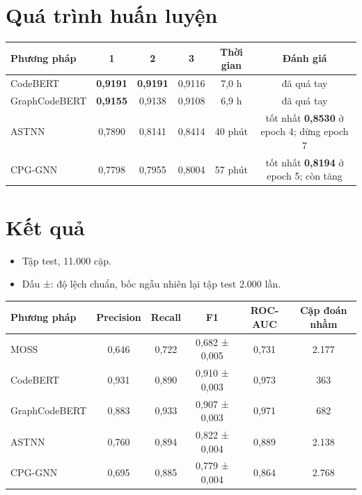 \documentclass[11pt,a4paper]{article}
\begin{document}
\section{Quá trình huấn luyện}

{\small
\begin{tabular*}{\textwidth}{@{\extracolsep{\fill}}lccccc@{}}
\toprule
\textbf{Phương pháp} & \textbf{1} & \textbf{2} & \textbf{3} &
\textbf{Thời gian} & \textbf{Đánh giá} \\
\midrule
CodeBERT      & \textbf{0,9191} & \textbf{0,9191} & 0,9116 & 7,0 h & đã quá tay \\
GraphCodeBERT & \textbf{0,9155} & 0,9138 & 0,9108 & 6,9 h & đã quá tay \\
ASTNN         & 0,7890 & 0,8141 & 0,8414 & 40 phút &
              tốt nhất \textbf{0,8530} ở epoch 4; dừng epoch 7 \\
CPG-GNN       & 0,7798 & 0,7955 & 0,8004 & 57 phút &
              tốt nhất \textbf{0,8194} ở epoch 5; còn tăng \\
\bottomrule
\end{tabular*}\par}

\section{Kết quả}

\begin{itemize}
\item Tập test, 11.000 cặp.
\item Dấu ±: độ lệch chuẩn, bốc ngẫu nhiên lại tập test 2.000 lần.
\end{itemize}

{\small
\begin{tabular*}{\textwidth}{@{\extracolsep{\fill}}lccccc@{}}
\toprule
\textbf{Phương pháp} & \textbf{Precision} & \textbf{Recall} & \textbf{F1} &
\textbf{ROC-AUC} & \textbf{Cặp đoán nhầm} \\
\midrule
MOSS          & 0,646 & 0,722 & 0,682 ± 0,005 & 0,731 & 2.177 \\
CodeBERT      & 0,931 & 0,890 & 0,910 ± 0,003 & 0,973 & 363 \\
GraphCodeBERT & 0,883 & 0,933 & 0,907 ± 0,003 & 0,971 & 682 \\
ASTNN         & 0,760 & 0,894 & 0,822 ± 0,004 & 0,889 & 2.138 \\
CPG-GNN       & 0,695 & 0,885 & 0,779 ± 0,004 & 0,864 & 2.768 \\
\bottomrule
\end{tabular*}\par}
\end{document}
